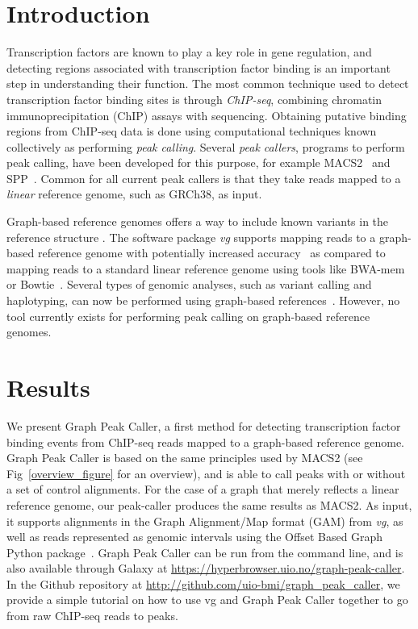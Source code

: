 \documentclass[10pt,letterpaper]{article}
\begin{document}
\section*{Introduction}
Transcription factors are known to play a key role in gene regulation, and detecting regions associated with transcription factor binding is an important step in understanding their function. The most common technique used to detect transcription factor binding sites is through \emph{ChIP-seq}, combining chromatin immunoprecipitation (ChIP) assays with sequencing. Obtaining putative binding regions from ChIP-seq data is done using computational techniques known collectively as performing \emph{peak calling}. Several \emph{peak callers}, programs to perform peak calling, have been developed for this purpose, for example MACS2~\cite{macs} and SPP~\cite{spp}. Common for all current peak callers is that they take reads mapped to a \emph{linear} reference genome, such as GRCh38, as input. 

Graph-based reference genomes offers a way to include known variants in the reference structure \cite{graph_evolution}. The software package \emph{vg} supports mapping reads to a graph-based reference genome with potentially increased accuracy~\cite{vg, genome_graphs} as compared to mapping reads to a standard linear reference genome using tools like BWA-mem~\cite{bwa_mem} or Bowtie~\cite{bowtie}. Several types of genomic analyses, such as variant calling and haplotyping, can now be performed using graph-based references~\cite{vg, genome_graphs}. However, no tool currently exists for performing peak calling on graph-based reference genomes. 

\section*{Results}
We present Graph Peak Caller, a first method for detecting transcription factor binding events from ChIP-seq reads mapped to a graph-based reference genome. Graph Peak Caller is based on the same principles used by MACS2 (see Fig~\ref{overview_figure} for an overview), and  is able to call peaks with or without a set of control alignments. For the case of a graph that merely reflects a linear reference genome, our peak-caller produces the same results as MACS2. As input, it supports alignments in the Graph Alignment/Map format (GAM) from \emph{vg}, as well as reads represented as genomic intervals using the Offset Based Graph Python package~\cite{rand}. Graph Peak Caller can be run from the command line, and is also available through Galaxy at \url{https://hyperbrowser.uio.no/graph-peak-caller}. In the Github repository at \url{http://github.com/uio-bmi/graph_peak_caller}, we provide a simple tutorial on how to use vg and Graph Peak Caller together to go from raw ChIP-seq reads to peaks. 
\end{document}

